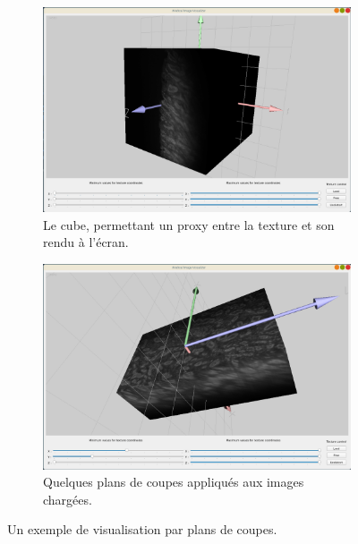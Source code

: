 {{		\begin{figure}[!h]
            \begin{subfigure}{.49\linewidth}
                \centering
                \includegraphics[width=.9\linewidth]{img/ui1.png}
                \captionsetup{width=.9\linewidth}
                \caption{Le cube, permettant un proxy entre la texture et son rendu à l'écran.}
                \label{img:ui1}
            \end{subfigure}
            \hfill
            \begin{subfigure}{.49\linewidth}
                \centering
                \includegraphics[width=.9\linewidth]{img/ui2.png}
                \captionsetup{width=.9\linewidth}
                \caption{Quelques plans de coupes appliqués aux images chargées.}
                \label{img:ui2}
            \end{subfigure}
            \caption{Un exemple de visualisation par plans de coupes.}
        \end{figure}

}}
